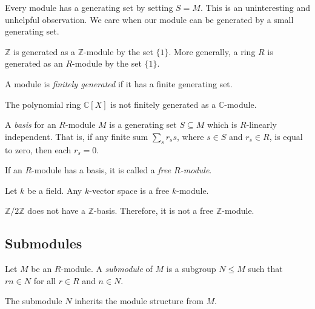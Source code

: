 \documentclass[a4paper,11pt]{article}
\begin{document}
    Every module has a generating set by setting \(S = M\). This is an uninteresting and unhelpful observation. We care when our module can be generated by a small generating set.

    \begin{example}
      \(\mathbb{Z}\) is generated as a \(\mathbb{Z}\)-module by the set \(\{1\}\). More generally, a ring \(R\) is generated as an \(R\)-module by the set \(\{1\}\).
    \end{example}

    \begin{definition}
      A module is \emph{finitely generated} if it has a finite generating set.
    \end{definition}

    \begin{example}
      The polynomial ring \(\mathbb{C}[X]\) is not finitely generated as a \(\mathbb{C}\)-module.
    \end{example}

    \begin{definition}
      A \emph{basis} for an \(R\)-module \(M\) is a generating set \(S \subseteq M\) which is \(R\)-linearly independent. That is, if any finite sum \(\sum_s r_s s\), where \(s \in S\) and \(r_s \in R\), is equal to zero, then each \(r_s = 0\).

      If an \(R\)-module has a basis, it is called a \emph{free \(R\)-module}.
    \end{definition}

    \begin{example}
      Let \(k\) be a field. Any \(k\)-vector space is a free \(k\)-module.
    \end{example}

    \begin{example}
      \(\mathbb{Z}/2 \mathbb{Z}\) does not have a \(\mathbb{Z}\)-basis. Therefore, it is not a free \(\mathbb{Z}\)-module.
    \end{example}

    \subsection{Submodules}
    \begin{definition}
      Let \(M\) be an \(R\)-module. A \emph{submodule} of \(M\) is a subgroup \(N \le M\) such that \(rn \in N\) for all \(r \in R\) and \(n \in N\).
    \end{definition}
    The submodule \(N\) inherits the module structure from \(M\).
\end{document}
